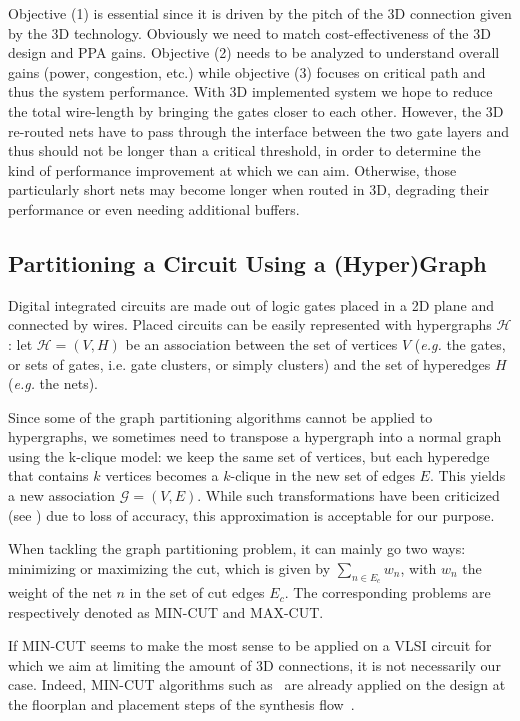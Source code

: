 \documentclass[conference]{IEEEtran}
\begin{document}
Objective (1) is essential since it is driven by the pitch of the 3D connection given by the 3D technology. Obviously we need to match cost-effectiveness of the 3D design and PPA gains. Objective (2) needs to be analyzed to understand overall gains (power, congestion, etc.) while objective (3) focuses on critical path and thus the system performance. With 3D implemented system we hope to reduce the total wire-length by bringing the gates closer to each other. However, the 3D re-routed nets have to pass through the interface between the two gate layers and thus should not be longer than a critical threshold, in order to determine the kind of performance improvement at which we can aim. 
Otherwise, those particularly short nets may become longer when routed in 3D, degrading their performance or even needing additional buffers.

\subsection{Partitioning a Circuit Using a (Hyper)Graph}
Digital integrated circuits are made out of logic gates placed in a 2D plane and connected by wires. Placed circuits can be easily represented with hypergraphs $\mathcal{H}$: let $\mathcal{H} = (V, H)$ be an association between the set of vertices $V$ (\textit{e.g.} the gates, or sets of gates, i.e. gate clusters, or simply clusters) and the set of hyperedges $H$ (\textit{e.g.} the nets). 

Since some of the graph partitioning algorithms cannot be applied to hypergraphs, we sometimes need to transpose a hypergraph into a normal graph using the k-clique model: we keep the same set of vertices, but each hyperedge that contains $k$ vertices becomes a $k$-clique in the new set of edges $E$. This yields a new association $\mathcal{G} = (V, E)$. While such transformations have been criticized (see \cite{IhlerEdmund;WagnerDorothea;Wagner1993}) due to loss of accuracy, this approximation is acceptable for our purpose. %

When tackling the graph partitioning problem, it can mainly go two ways: minimizing or maximizing the cut, which is given by $\sum_{n \in E_c} w_{n}$, with $w_n$ the weight of the net $n$ in the set of cut edges $E_c$. The corresponding problems are respectively denoted as MIN-CUT and MAX-CUT.

If MIN-CUT seems to make the most sense to be applied on a VLSI circuit for which we aim at limiting the amount of 3D connections, it is not necessarily our case. Indeed, MIN-CUT algorithms such as~\cite{Karypis1999, Aykanat2011, Caldwell2000} are already applied on the design at the floorplan and placement steps of the synthesis flow~\cite{KahngAndrewB.Lienig2011}.
\end{document}
